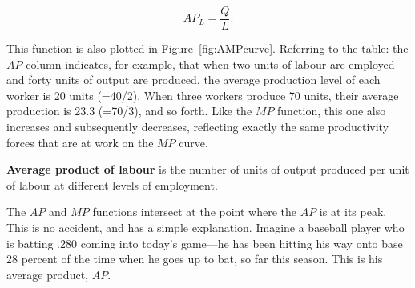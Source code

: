 \begin{equation*}
AP_L=\frac{Q}{L}.
\end{equation*}

This function is also plotted in Figure~\ref{fig:AMPcurve}. Referring to the table: the $AP$ column indicates, for example, that when two units of labour are employed and forty units of output are produced, the average production level of each worker is 20 units (=40/2). When three workers produce 70 units, their average production is 23.3 (=70/3), and so forth. Like the $MP$ function, this one also increases and subsequently decreases, reflecting exactly the same productivity forces that are at work on the $MP$ curve.

\begin{DefBox}
\textbf{Average product of labour} is the number of units of output produced per unit of labour at different levels of employment.
\end{DefBox}

The $AP$ and $MP$ functions intersect at the point where the $AP$ is at its peak. This is no accident, and has a simple explanation. Imagine a baseball player who is batting .280 coming into today's game---he has been hitting his way onto base 28 percent of the time when he goes up to bat, so far this season. This is his average product, $AP$. 

